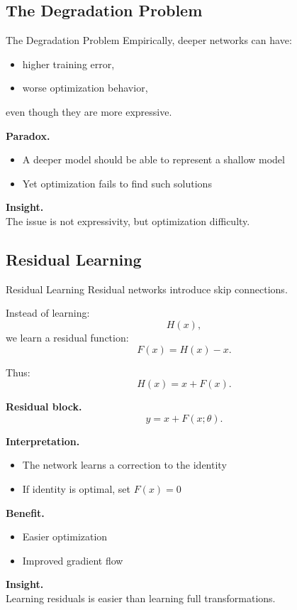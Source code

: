 \documentclass[aspectratio=169,11pt]{beamer}
\begin{document}
\subsection{The Degradation Problem}
\begin{frame}[t,allowframebreaks]{The Degradation Problem}
\small
Empirically, deeper networks can have:

\begin{itemize}
    \item higher training error,
    \item worse optimization behavior,
\end{itemize}

even though they are more expressive.

\textbf{Paradox.}\\ \begin{itemize}
    \item A deeper model should be able to represent a shallow model
    \item Yet optimization fails to find such solutions
\end{itemize}

\textbf{Insight.}\\ The issue is not expressivity, but optimization difficulty.
\end{frame}

\subsection{Residual Learning}
\begin{frame}[t,allowframebreaks]{Residual Learning}
\small
Residual networks introduce skip connections.

Instead of learning:
\[
H(x),
\]
we learn a residual function:
\[
F(x) = H(x) - x.
\]

Thus:
\[
H(x) = x + F(x).
\]

\textbf{Residual block.}\\ \[
y = x + F(x; \theta).
\]

\textbf{Interpretation.}\\ \begin{itemize}
    \item The network learns a correction to the identity
    \item If identity is optimal, set $F(x) = 0$
\end{itemize}

\textbf{Benefit.}\\ \begin{itemize}
    \item Easier optimization
    \item Improved gradient flow
\end{itemize}

\textbf{Insight.}\\ Learning residuals is easier than learning full transformations.
\end{frame}
\end{document}
